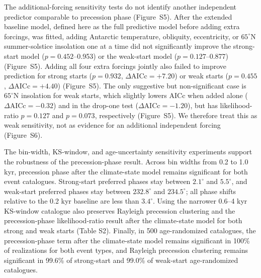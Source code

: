 \documentclass[11pt]{article}
\begin{document}
The additional-forcing sensitivity tests do not identify another independent predictor comparable to precession phase (Figure~S5). After the extended baseline model, defined here as the full predictive model before adding extra forcings, was fitted, adding Antarctic temperature, obliquity, eccentricity, or \(65^\circ\)N summer-solstice insolation one at a time did not significantly improve the strong-start model (\(p=0.452\)--0.953) or the weak-start model (\(p=0.127\)--0.877) (Figure~S5). Adding all four extra forcings jointly also failed to improve prediction for strong starts (\(p=0.932\), \(\Delta\mathrm{AICc}=+7.20\)) or weak starts (\(p=0.455\), \(\Delta\mathrm{AICc}=+4.40\)) (Figure~S5). The only suggestive but non-significant case is \(65^\circ\)N insolation for weak starts, which slightly lowers AICc when added alone (\(\Delta\mathrm{AICc}=-0.32\)) and in the drop-one test (\(\Delta\mathrm{AICc}=-1.20\)), but has likelihood-ratio \(p=0.127\) and \(p=0.073\), respectively (Figure~S5). We therefore treat this as weak sensitivity, not as evidence for an additional independent forcing (Figure~S6).

The bin-width, KS-window, and age-uncertainty sensitivity experiments support the robustness of the precession-phase result. Across bin widths from 0.2 to 1.0 kyr, precession phase after the climate-state model remains significant for both event catalogues. Strong-start preferred phases stay between \(2.1^\circ\) and \(5.5^\circ\), and weak-start preferred phases stay between \(232.8^\circ\) and \(234.5^\circ\); all phase shifts relative to the 0.2 kyr baseline are less than \(3.4^\circ\). Using the narrower 0.6--4 kyr KS-window catalogue also preserves Rayleigh precession clustering and the precession-phase likelihood-ratio result after the climate-state model for both strong and weak starts (Table S2). Finally, in 500 age-randomized catalogues, the precession-phase term after the climate-state model remains significant in 100\% of realizations for both event types, and Rayleigh precession clustering remains significant in 99.6\% of strong-start and 99.0\% of weak-start age-randomized catalogues.
\end{document}
